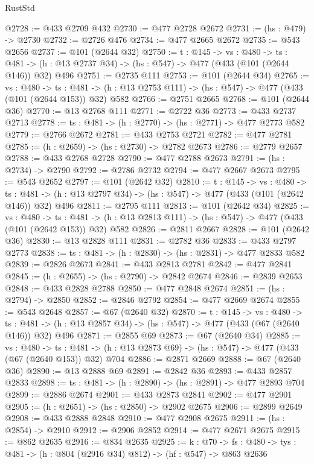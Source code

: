 \begin{lexlean}{RustStd}
\begin{coremodule}
{\begin{coremodule}
{{{{{{{{{{{{{{{{@2728 := @433 @2709 @432
@2730 := @477 @2728 @2672
@2731 := (hs : @479) -> @2730
@2732 := @2726 @476
@2734 := @477 @2665 @2672
@2735 := @543 @2656
@2737 := @101 (@2644 @32)
@2750 := {t : @145} ->
  {vs : @480} ->
  {ts : @481} -> (h : @13 @2737 @34) -> (hs : @547) -> @477 (@433 (@101 (@2644 @146)) @32) @496
@2751 := @2735 @111
@2753 := @101 (@2644 @34)
@2765 := {vs : @480} ->
  {ts : @481} -> (h : @13 @2753 @111) -> (hs : @547) -> @477 (@433 (@101 (@2644 @153)) @32) @582
@2766 := @2751 @2665
@2768 := @101 (@2644 @36)
@2770 := @13 @2768 @111
@2771 := @2722 @36
@2773 := @433 @2737 @2713
@2778 := {ts : @481} -> (h : @2770) -> (hs : @2771) -> @477 @2773 @582
@2779 := @2766 @2672
@2781 := @433 @2753 @2721
@2782 := @477 @2781
@2785 := (h : @2659) -> (hs : @2730) -> @2782 @2673
@2786 := @2779 @2657
@2788 := @433 @2768 @2728
@2790 := @477 @2788 @2673
@2791 := (hs : @2734) -> @2790
@2792 := @2786 @2732
@2794 := @477 @2667 @2673
@2795 := @543 @2652
@2797 := @101 (@2642 @32)
@2810 := {t : @145} ->
  {vs : @480} ->
  {ts : @481} -> (h : @13 @2797 @34) -> (hs : @547) -> @477 (@433 (@101 (@2642 @146)) @32) @496
@2811 := @2795 @111
@2813 := @101 (@2642 @34)
@2825 := {vs : @480} ->
  {ts : @481} -> (h : @13 @2813 @111) -> (hs : @547) -> @477 (@433 (@101 (@2642 @153)) @32) @582
@2826 := @2811 @2667
@2828 := @101 (@2642 @36)
@2830 := @13 @2828 @111
@2831 := @2782 @36
@2833 := @433 @2797 @2773
@2838 := {ts : @481} -> (h : @2830) -> (hs : @2831) -> @477 @2833 @582
@2839 := @2826 @2673
@2841 := @433 @2813 @2781
@2842 := @477 @2841
@2845 := (h : @2655) -> (hs : @2790) -> @2842 @2674
@2846 := @2839 @2653
@2848 := @433 @2828 @2788
@2850 := @477 @2848 @2674
@2851 := (hs : @2794) -> @2850
@2852 := @2846 @2792
@2854 := @477 @2669 @2674
@2855 := @543 @2648
@2857 := @67 (@2640 @32)
@2870 := {t : @145} ->
  {vs : @480} ->
  {ts : @481} -> (h : @13 @2857 @34) -> (hs : @547) -> @477 (@433 (@67 (@2640 @146)) @32) @496
@2871 := @2855 @69
@2873 := @67 (@2640 @34)
@2885 := {vs : @480} ->
  {ts : @481} -> (h : @13 @2873 @69) -> (hs : @547) -> @477 (@433 (@67 (@2640 @153)) @32) @704
@2886 := @2871 @2669
@2888 := @67 (@2640 @36)
@2890 := @13 @2888 @69
@2891 := @2842 @36
@2893 := @433 @2857 @2833
@2898 := {ts : @481} -> (h : @2890) -> (hs : @2891) -> @477 @2893 @704
@2899 := @2886 @2674
@2901 := @433 @2873 @2841
@2902 := @477 @2901
@2905 := (h : @2651) -> (hs : @2850) -> @2902 @2675
@2906 := @2899 @2649
@2908 := @433 @2888 @2848
@2910 := @477 @2908 @2675
@2911 := (hs : @2854) -> @2910
@2912 := @2906 @2852
@2914 := @477 @2671 @2675
@2915 := @862 @2635
@2916 := @834 @2635
@2925 := {k : @70} ->
  {fs : @480} -> {tys : @481} -> (h : @804 (@2916 @34) @812) -> (hf : @547) -> @863 @2636
}}}}}}}}}}}}}}}}
\end{coremodule}}
\end{coremodule}
\end{lexlean}
